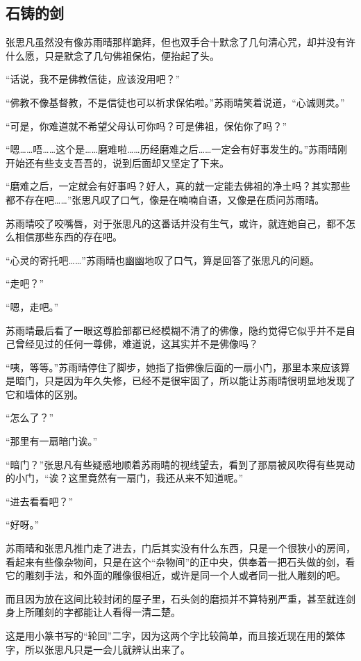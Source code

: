 \subsection{石铸的剑}

张思凡虽然没有像苏雨晴那样跪拜，但也双手合十默念了几句清心咒，却并没有许什么愿，只是默念了几句佛祖保佑，便抬起了头。

“话说，我不是佛教信徒，应该没用吧？”

“佛教不像基督教，不是信徒也可以祈求保佑啦。”苏雨晴笑着说道，“心诚则灵。”

“可是，你难道就不希望父母认可你吗？可是佛祖，保佑你了吗？”

“嗯……唔……这个是……磨难啦……历经磨难之后……一定会有好事发生的。”苏雨晴刚开始还有些支支吾吾的，说到后面却又坚定了下来。

“磨难之后，一定就会有好事吗？好人，真的就一定能去佛祖的净土吗？其实那些都不存在吧……”张思凡叹了口气，像是在喃喃自语，又像是在质问苏雨晴。

苏雨晴咬了咬嘴唇，对于张思凡的这番话并没有生气，或许，就连她自己，都不怎么相信那些东西的存在吧。

“心灵的寄托吧……”苏雨晴也幽幽地叹了口气，算是回答了张思凡的问题。

“走吧？”

“嗯，走吧。”

苏雨晴最后看了一眼这尊脸部都已经模糊不清了的佛像，隐约觉得它似乎并不是自己曾经见过的任何一尊佛，难道说，这其实并不是佛像吗？

“咦，等等。”苏雨晴停住了脚步，她指了指佛像后面的一扇小门，那里本来应该算是暗门，只是因为年久失修，已经不是很牢固了，所以能让苏雨晴很明显地发现了它和墙体的区别。

“怎么了？”

“那里有一扇暗门诶。”

“暗门？”张思凡有些疑惑地顺着苏雨晴的视线望去，看到了那扇被风吹得有些晃动的小门，“诶？这里竟然有一扇门，我还从来不知道呢。”

“进去看看吧？”

“好呀。”

苏雨晴和张思凡推门走了进去，门后其实没有什么东西，只是一个很狭小的房间，看起来有些像杂物间，只是在这个“杂物间”的正中央，供奉着一把石头做的剑，看它的雕刻手法，和外面的雕像很相近，或许是同一个人或者同一批人雕刻的吧。

而且因为放在这间比较封闭的屋子里，石头剑的磨损并不算特别严重，甚至就连剑身上所雕刻的字都能让人看得一清二楚。

这是用小篆书写的“轮回”二字，因为这两个字比较简单，而且接近现在用的繁体字，所以张思凡只是一会儿就辨认出来了。

